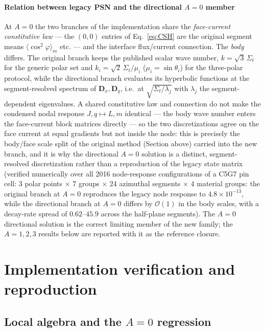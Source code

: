 \documentclass[11pt,a4paper]{article}
\begin{document}
\paragraph{Relation between legacy PSN and the directional $A{=}0$ member}
\label{sec:a3a0}
At $A{=}0$ the two branches of the implementation share the
\emph{face-current constitutive law} --- the $(0,0)$ entries of
Eq.~\eqref{eq:CSH} are the original segment means
$\langle\cos^2\varphi\rangle_m$ etc. --- and the interface
flux/current connection. The \emph{body} differs. The original branch
keeps the published scalar wave number, $k=\sqrt{3}\,\Sigma_t$ for the
generic polar set and $k_i=\sqrt{2}\,\Sigma_t/\mu_i$
($\mu_i=\sin\theta_i$) for the three-polar protocol, while the
directional branch evaluates its hyperbolic functions at the
segment-resolved spectrum of $\mathbf{D}_x,\mathbf{D}_y$, i.e.\ at
$\sqrt{\Sigma_t/\lambda_j}$ with $\lambda_j$ the segment-dependent
eigenvalues. A shared constitutive law and connection do not make the
condensed nodal response $J,q\mapsto L,m$ identical --- the body wave
number enters the face-current block matrices directly --- so the two
discretizations agree on the face current at equal gradients but not
inside the node: this is precisely the body/face scale split of the
original method (Section above) carried into the new branch, and it is
why the directional $A{=}0$ solution is a distinct, segment-resolved
discretization rather than a reproduction of the legacy state matrix
(verified numerically over all 2016 node-response configurations of a
C5G7 pin cell: 3 polar points $\times$ 7 groups $\times$ 24 azimuthal
segments $\times$ 4 material groups: the original branch at $A{=}0$
reproduces the legacy node response to $4.8\times10^{-13}$, while the
directional branch at $A{=}0$ differs by $\mathcal{O}(1)$ in the body
scales, with a decay-rate spread of $0.62$--$45.9$ across the
half-plane segments).
The $A{=}0$ directional solution is the correct limiting member of the
new family; the $A{=}1,2,3$ results below are reported with it as the
reference closure.

\section{Implementation verification and reproduction}

\subsection{Local algebra and the $A{=}0$ regression}
\end{document}

